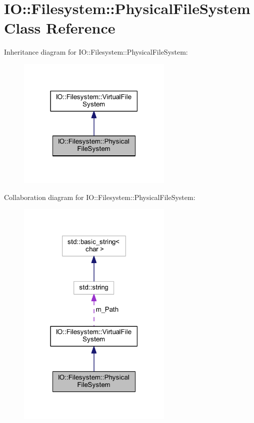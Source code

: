 \hypertarget{class_i_o_1_1_filesystem_1_1_physical_file_system}{}\section{IO\+:\+:Filesystem\+:\+:Physical\+File\+System Class Reference}
\label{class_i_o_1_1_filesystem_1_1_physical_file_system}


Inheritance diagram for IO\+:\+:Filesystem\+:\+:Physical\+File\+System\+:
\nopagebreak
\begin{figure}[H]
\begin{center}
\leavevmode
\includegraphics[width=210pt]{class_i_o_1_1_filesystem_1_1_physical_file_system__inherit__graph}
\end{center}
\end{figure}


Collaboration diagram for IO\+:\+:Filesystem\+:\+:Physical\+File\+System\+:
\nopagebreak
\begin{figure}[H]
\begin{center}
\leavevmode
\includegraphics[width=210pt]{class_i_o_1_1_filesystem_1_1_physical_file_system__coll__graph}
\end{center}
\end{figure}
